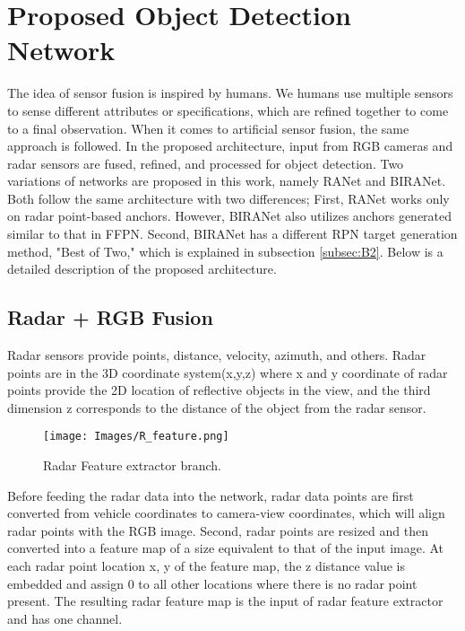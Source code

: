 \documentclass{article}
\begin{document}
\section{Proposed Object Detection Network}
\label{sec:format}
The idea of sensor fusion is inspired by humans. We humans use multiple sensors to sense different attributes or specifications, which are refined together to come to a final observation. When it comes to artificial sensor fusion, the same approach is followed. In the proposed architecture, input from RGB cameras and radar sensors are fused, refined, and processed for object detection.
Two variations of networks are proposed in this work, namely RANet and BIRANet. Both follow the same architecture with two differences; First, RANet works only on radar point-based anchors. However, BIRANet also utilizes anchors generated similar to that in FFPN. Second, BIRANet has a different RPN target generation method, "Best of Two," which is explained in subsection \ref{subsec:B2}. Below is a detailed description of the proposed architecture.
\subsection{Radar + RGB Fusion}
Radar sensors provide points, distance, velocity, azimuth, and others. Radar points are in the 3D coordinate system(x,y,z) where x and y coordinate of radar points provide the 2D location of reflective objects in the view, and the third dimension z corresponds to the distance of the object from the radar sensor.
\begin{figure}[htbp]
\centerline{\texttt{[image: Images/R\_feature.png]}}
\caption{Radar Feature extractor branch.}
\label{fig1}
\end{figure}
Before feeding the radar data into the network, radar data points are first converted from vehicle coordinates to camera-view coordinates, which will align radar points with the RGB image. Second, radar points are resized and then converted into a feature map of a size equivalent to that of the input image. At each radar point location x, y of the feature map, the z distance value is embedded and assign 0 to all other locations where there is no radar point present. The resulting radar feature map is the input of radar feature extractor and has one channel.
\end{document}
